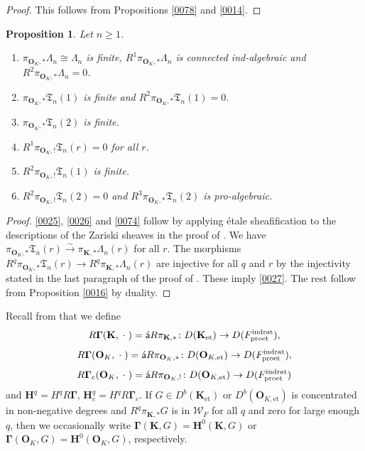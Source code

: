 \documentclass{amsart}
\newtheorem{Prop}[Thm]{Proposition}
\theoremstyle{remark}
\numberwithin{equation}{section}
\newcommand{\isomto}{\overset{\sim}{\to}}
\newcommand{\et}{\mathrm{et}}
\newcommand{\rat}{\mathrm{rat}}
\newcommand{\ind}{\mathrm{ind}}
\newcommand{\pro}{\mathrm{pro}}
\newcommand{\alg}[1]{\mathbf{#1}}
\newcommand{\var}{\;\cdot\;}
\newcommand{\algebrize}{\Acute{\mathsf{a}}}
\begin{document}
\begin{proof}
	This follows from Propositions \ref{0078} and \ref{0014}.
\end{proof}

\begin{Prop} \label{0030}
	Let $n \ge 1$.
	\begin{enumerate}
		\item \label{0025}
			$\pi_{\alg{O}_{K}, \ast} \Lambda_{n} \cong \Lambda_{n}$ is finite,
			$R^{1} \pi_{\alg{O}_{K}, \ast} \Lambda_{n}$ is connected ind-algebraic and
			$R^{2} \pi_{\alg{O}_{K}, \ast} \Lambda_{n} = 0$.
		\item \label{0026}
			$\pi_{\alg{O}_{K}, \ast} \mathfrak{T}_{n}(1)$ is finite and
			$R^{2} \pi_{\alg{O}_{K}, \ast} \mathfrak{T}_{n}(1) = 0$.
		\item \label{0074}
			$\pi_{\alg{O}_{K}, \ast} \mathfrak{T}_{n}(2)$ is finite.
		\item \label{0027}
			$R^{1} \pi_{\alg{O}_{K}, !} \mathfrak{T}_{n}(r) = 0$ for all $r$.
		\item \label{0029}
			$R^{2} \pi_{\alg{O}_{K}, !} \mathfrak{T}_{n}(1)$ is finite.
		\item \label{0028}
			$R^{2} \pi_{\alg{O}_{K}, !} \mathfrak{T}_{n}(2) = 0$ and
			$R^{3} \pi_{\alg{O}_{K}, \ast} \mathfrak{T}_{n}(2)$ is pro-algebraic.
	\end{enumerate}
\end{Prop}

\begin{proof}
	\eqref{0025}, \eqref{0026} and \eqref{0074} follow by applying \'etale sheafification to
	the descriptions of the Zariski sheaves in the proof of \cite[Proposition 6.5.2]{Suz24}.
	We have $\pi_{\alg{O}_{K}, \ast} \mathfrak{T}_{n}(r) \isomto \pi_{\alg{K}, \ast} \Lambda_{n}(r)$
	for all $r$.
	The morphisms
	$R^{q} \pi_{\alg{O}_{K}, \ast} \mathfrak{T}_{n}(r) \to R^{q} \pi_{\alg{K}, \ast} \Lambda_{n}(r)$
	are injective for all $q$ and $r$
	by the injectivity stated in the last paragraph of the proof of \cite[Proposition 6.5.2]{Suz24}.
	These imply \eqref{0027}.
	The rest follow from Proposition \ref{0016} by duality.
\end{proof}

Recall from \cite[paragraph after Proposition 4.3.2]{Suz24}
that we define
	\[
			R \alg{\Gamma}(\alg{K}, \var)
		=
			\algebrize R \pi_{\alg{K}, \ast}
		\colon
			D(\alg{K}_{\et})
		\to
			D(F^{\ind\rat}_{\pro\et}),
	\]
	\[
			R \alg{\Gamma}(\alg{O}_{K}, \var)
		=
			\algebrize R \pi_{\alg{O}_{K}, \ast}
		\colon
			D(\alg{O}_{K, \et})
		\to
			D(F^{\ind\rat}_{\pro\et}),
	\]
	\[
			R \alg{\Gamma}_{c}(\alg{O}_{K}, \var)
		=
			\algebrize R \pi_{\alg{O}_{K}, !}
		\colon
			D(\alg{O}_{K, \et})
		\to
			D(F^{\ind\rat}_{\pro\et})
	\]
and $\alg{H}^{q} = H^{q} R \alg{\Gamma}$, $\alg{H}^{q}_{c} = H^{q} R \alg{\Gamma}_{c}$.
If $G \in D^{b}(\alg{K}_{\et})$ or $D^{b}(\alg{O}_{K, \et})$ is concentrated in non-negative degrees
and $R^{q} \pi_{\alg{K}, \ast} G$ is in $\mathcal{W}_{F}$ for all $q$ and zero for large enough $q$,
then we occasionally write $\alg{\Gamma}(\alg{K}, G) = \alg{H}^{0}(\alg{K}, G)$
or $\alg{\Gamma}(\alg{O}_{K}, G) = \alg{H}^{0}(\alg{O}_{K}, G)$, respectively.
\end{document}
